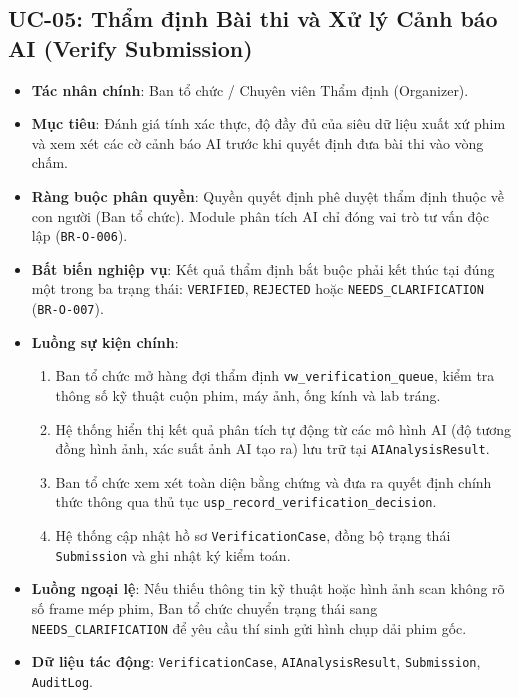 \subsection{UC-05: Thẩm định Bài thi và Xử lý Cảnh báo AI (Verify Submission)}
\begin{itemize}
    \item \textbf{Tác nhân chính}: Ban tổ chức / Chuyên viên Thẩm định (Organizer).
    \item \textbf{Mục tiêu}: Đánh giá tính xác thực, độ đầy đủ của siêu dữ liệu xuất xứ phim và xem xét các cờ cảnh báo AI trước khi quyết định đưa bài thi vào vòng chấm.
    \item \textbf{Ràng buộc phân quyền}: Quyền quyết định phê duyệt thẩm định thuộc về con người (Ban tổ chức). Module phân tích AI chỉ đóng vai trò tư vấn độc lập (\texttt{BR-O-006}).
    \item \textbf{Bất biến nghiệp vụ}: Kết quả thẩm định bắt buộc phải kết thúc tại đúng một trong ba trạng thái: \texttt{VERIFIED}, \texttt{REJECTED} hoặc \texttt{NEEDS\_CLARIFICATION} (\texttt{BR-O-007}).
    \item \textbf{Luồng sự kiện chính}:
    \begin{enumerate}
        \item Ban tổ chức mở hàng đợi thẩm định \texttt{vw\_verification\_queue}, kiểm tra thông số kỹ thuật cuộn phim, máy ảnh, ống kính và lab tráng.
        \item Hệ thống hiển thị kết quả phân tích tự động từ các mô hình AI (độ tương đồng hình ảnh, xác suất ảnh AI tạo ra) lưu trữ tại \texttt{AIAnalysisResult}.
        \item Ban tổ chức xem xét toàn diện bằng chứng và đưa ra quyết định chính thức thông qua thủ tục \texttt{usp\_record\_verification\_decision}.
        \item Hệ thống cập nhật hồ sơ \texttt{VerificationCase}, đồng bộ trạng thái \texttt{Submission} và ghi nhật ký kiểm toán.
    \end{enumerate}
    \item \textbf{Luồng ngoại lệ}: Nếu thiếu thông tin kỹ thuật hoặc hình ảnh scan không rõ số frame mép phim, Ban tổ chức chuyển trạng thái sang \texttt{NEEDS\_CLARIFICATION} để yêu cầu thí sinh gửi hình chụp dải phim gốc.
    \item \textbf{Dữ liệu tác động}: \texttt{VerificationCase}, \texttt{AIAnalysisResult}, \texttt{Submission}, \texttt{AuditLog}.
\end{itemize}

